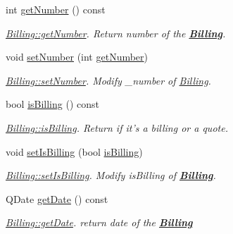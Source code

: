\begin{DoxyCompactItemize}
int \hyperlink{classModels_1_1Billing_a48c6e28a4aec13f8ed6b3ebbab837f0b}{get\-Number} () const 
\begin{DoxyCompactList}\small\item\em \hyperlink{classModels_1_1Billing_a48c6e28a4aec13f8ed6b3ebbab837f0b}{Billing\-::get\-Number}. Return number of the {\bfseries \hyperlink{classModels_1_1Billing}{Billing}}. \end{DoxyCompactList}\item 
void \hyperlink{classModels_1_1Billing_a2b43e0c657a9e717c9d2c091d222369e}{set\-Number} (int \hyperlink{classModels_1_1Billing_a48c6e28a4aec13f8ed6b3ebbab837f0b}{get\-Number})
\begin{DoxyCompactList}\small\item\em \hyperlink{classModels_1_1Billing_a2b43e0c657a9e717c9d2c091d222369e}{Billing\-::set\-Number}. Modify {\itshape \-\_\-number} of \hyperlink{classModels_1_1Billing}{Billing}. \end{DoxyCompactList}\item 
bool \hyperlink{classModels_1_1Billing_ab03dd29a9812a995355a1d93318f348f}{is\-Billing} () const 
\begin{DoxyCompactList}\small\item\em \hyperlink{classModels_1_1Billing_ab03dd29a9812a995355a1d93318f348f}{Billing\-::is\-Billing}. Return if it's a billing or a quote. \end{DoxyCompactList}\item 
void \hyperlink{classModels_1_1Billing_aff8b71426c02bc97f0a724ef762cd42e}{set\-Is\-Billing} (bool \hyperlink{classModels_1_1Billing_ab03dd29a9812a995355a1d93318f348f}{is\-Billing})
\begin{DoxyCompactList}\small\item\em \hyperlink{classModels_1_1Billing_aff8b71426c02bc97f0a724ef762cd42e}{Billing\-::set\-Is\-Billing}. Modify {\itshape is\-Billing} of {\bfseries \hyperlink{classModels_1_1Billing}{Billing}}. \end{DoxyCompactList}\item 
Q\-Date \hyperlink{classModels_1_1Billing_af0d1f0132d0902fb96456d0a9018b701}{get\-Date} () const 
\begin{DoxyCompactList}\small\item\em \hyperlink{classModels_1_1Billing_af0d1f0132d0902fb96456d0a9018b701}{Billing\-::get\-Date}. return date of the {\bfseries \hyperlink{classModels_1_1Billing}{Billing}} \end{DoxyCompactList}\item 

\end{DoxyCompactItemize}
